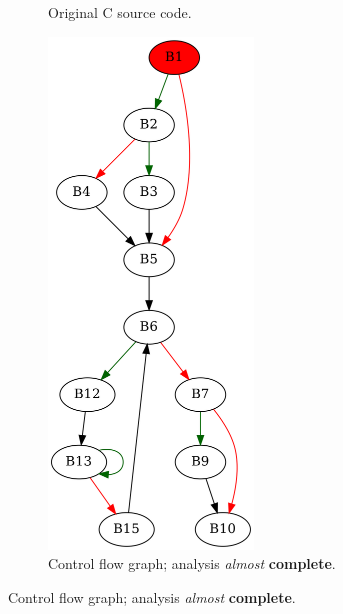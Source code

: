 \begin{figure}[htbp]
	\centering
	\begin{subfigure}[b]{0.30\textwidth}
		\centering
		
		\caption{Original C source code.}
	\end{subfigure}
	\begin{subfigure}[b]{0.50\textwidth}
		\centering
		\includegraphics[width=0.6\textwidth]{inc/appendices/examples/interval/example/sample/f_0005b.png}
		\caption{Control flow graph; analysis \textit{almost} \textbf{complete}.}
	\end{subfigure}
\end{figure}


